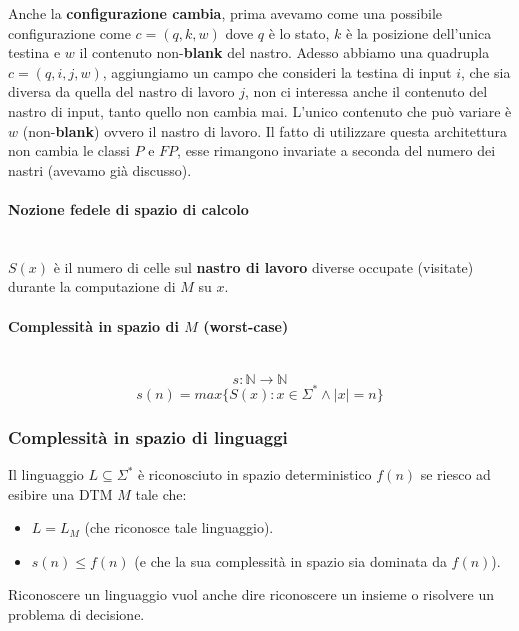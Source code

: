 \documentclass{article}
\begin{document}
Anche la \textbf{configurazione cambia}, prima avevamo come una possibile configurazione come
$c=(q,k,w)$ dove $q$ è lo stato, $k$ è la posizione dell'unica testina e $w$ il contenuto non-\textbf{blank}
del nastro. Adesso abbiamo una quadrupla $c=(q,i,j,w)$, aggiungiamo un campo che consideri
la testina di input $i$, che sia diversa
da quella del nastro di lavoro $j$, non ci interessa anche il contenuto del
nastro di input, tanto quello non cambia mai. L'unico contenuto che può variare è $w$ (non-\textbf{blank})
ovvero il nastro di lavoro.
\newline\newline
Il fatto di utilizzare questa architettura non cambia le classi $P$ e $FP$, esse rimangono
invariate a seconda del numero dei nastri (avevamo già discusso).

\paragraph{Nozione fedele di spazio di calcolo}\mbox{}\\
$S(x)$ è il numero di celle sul \textbf{nastro di lavoro} diverse occupate (visitate) durante la computazione
di $M$ su $x$.

\paragraph{Complessità in spazio di $M$ (worst-case)}\mbox{}\\
$$s:\mathbb{N}\rightarrow\mathbb{N}$$
$$s(n)=max\{S(x):x\in\Sigma^*\land|x|=n\}$$

\subsubsection{Complessità in spazio di linguaggi}
Il linguaggio $L\subseteq\Sigma^*$ è riconosciuto in spazio deterministico $f(n)$ se riesco
ad esibire una DTM $M$ tale che:
\begin{itemize}
    \item $L=L_M$ (che riconosce tale linguaggio).
    \item $s(n)\leq f(n)$ (e che la sua complessità in spazio sia dominata da $f(n)$).
\end{itemize}
Riconoscere un linguaggio vuol anche dire riconoscere un insieme o risolvere un problema di
decisione.
\end{document}
